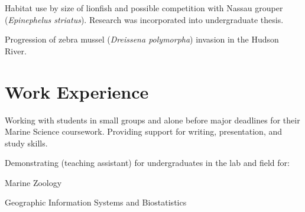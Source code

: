 \documentclass[a4paper]{deedy-resume} %
\begin{document}
Habitat use by size of lionfish and possible competition with Nassau grouper (\textit{Epinephelus striatus}). Research was incorporated into undergraduate thesis.

\sectionspace %



Progression of zebra mussel (\textit{Dreissena polymorpha}) invasion in the Hudson River.

\sectionspace %
\sectionspace



\section{Work Experience}



Working with students in small groups and alone before major deadlines for their Marine Science coursework. Providing support for writing, presentation, and study skills.

\sectionspace



Demonstrating (teaching assistant) for undergraduates in the lab and field for:
\begin{tightitemize}
\item Marine Zoology
\item Geographic Information Systems and Biostatistics
\end{tightitemize}



\end{document}
